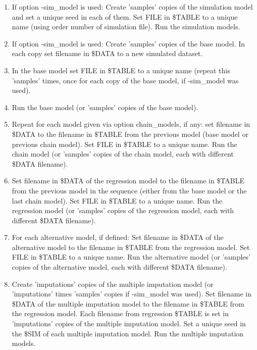 \begin{enumerate}

\item If option -sim\_model is used: Create 'samples' copies of the simulation model and set a unique  seed in each of them. Set FILE in \$TABLE to a unique name (using order number of simulation file). Run the simulation models.
\item If option -sim\_model is used: Create 'samples' copies of the base model. In each copy set filename in \$DATA to a new simulated dataset.
\item In the base model set FILE in \$TABLE to a unique name (repeat this 'samples' times, once for each copy of the base model, if -sim\_model was used).
\item Run the base model (or 'samples' copies of the base model).
\item Repeat for each model given via option chain\_models, if any: set filename in \$DATA to the filename in \$TABLE from the previous model (base model or previous chain model). Set FILE in \$TABLE to a unique name. Run the chain model (or 'samples' copies of the chain model, each with different \$DATA filename).
\item Set filename in \$DATA of the regression model to the filename in \$TABLE from the previous model in the sequence (either from the base model or the last chain model). Set FILE in \$TABLE to a unique name. Run the regression model (or 'samples' copies of the regression model, each with different \$DATA filename).
\item For each alternative model, if defined: Set filename in \$DATA of the alternative model to the filename in \$TABLE from the regression model. Set FILE in \$TABLE to a unique name. Run the alternative model (or 'samples' copies of the alternative model, each with different \$DATA filename).
\item Create 'imputations' copies of the multiple imputation model (or 'imputations' times 'samples' copies if -sim\_model was used). Set filename in \$DATA of the multiple imputation model to the filename in \$TABLE from the regression model. Each filename from regression \$TABLE is set in 'imputations' copies of the multiple imputation model. Set a unique seed in the \$SIM of each multiple imputation model. Run the multiple imputation models.
\end{enumerate}



